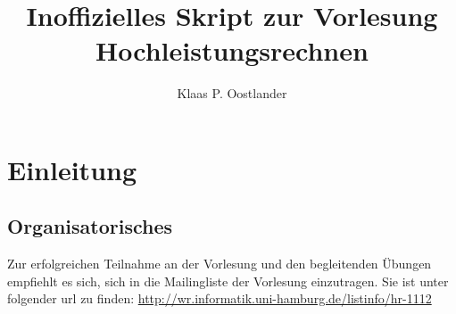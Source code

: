 \documentclass[10pt,oneside,a4paper]{scrartcl}
\author{Klaas P. Oostlander}
\title{Inoffizielles Skript zur Vorlesung Hochleistungsrechnen}
\begin{document}
\maketitle
\tableofcontents

\section{Einleitung}
\subsection{Organisatorisches}
Zur erfolgreichen Teilnahme an der Vorlesung und den begleitenden Übungen empfiehlt es sich, sich in die Mailingliste der Vorlesung einzutragen. Sie ist unter folgender url zu finden: \url{http://wr.informatik.uni-hamburg.de/listinfo/hr-1112}
\end{document}
